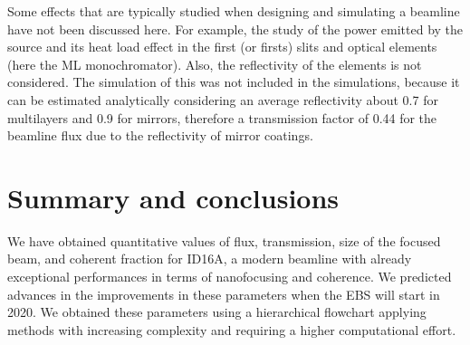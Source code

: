 \documentclass{iucr}              %
\begin{document}
Some effects that are typically studied when designing and simulating a beamline have not been discussed here. For example, the study of the power emitted by the source and its heat load effect in the first (or firsts) slits and optical elements (here the ML monochromator). Also, the reflectivity of the elements is not considered. The simulation of this was not included in the simulations, because it can be estimated analytically considering an average reflectivity about 0.7 for multilayers and 0.9 for mirrors, therefore a transmission factor of 0.44 for the beamline flux due to the reflectivity of mirror coatings. 


\section{Summary and conclusions}
\label{summary}

We have obtained quantitative values of flux, transmission, size of the focused beam, and coherent fraction for ID16A, a modern beamline with already exceptional performances in terms of nanofocusing and coherence. We predicted advances in the improvements in these parameters when the EBS will start in 2020. We obtained these parameters using a hierarchical flowchart applying methods with increasing complexity and requiring a higher computational effort. 
\end{document}
